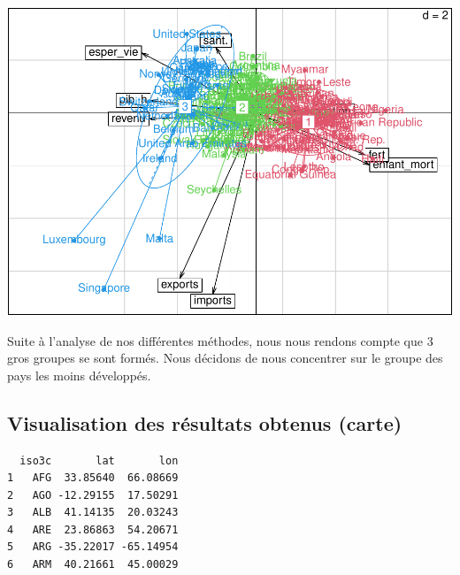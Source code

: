 \documentclass[
]{article}
\begin{document}
\includegraphics{Projet_files/figure-latex/unnamed-chunk-29-1.pdf}

Suite à l'analyse de nos différentes méthodes, nous nous rendons compte
que 3 gros groupes se sont formés. Nous décidons de nous concentrer sur
le groupe des pays les moins développés.

\hypertarget{visualisation-des-ruxe9sultats-obtenus-carte}{%
\subsection{Visualisation des résultats obtenus
(carte)}\label{visualisation-des-ruxe9sultats-obtenus-carte}}

\begin{verbatim}
  iso3c       lat       lon
1   AFG  33.85640  66.08669
2   AGO -12.29155  17.50291
3   ALB  41.14135  20.03243
4   ARE  23.86863  54.20671
5   ARG -35.22017 -65.14954
6   ARM  40.21661  45.00029
\end{verbatim}
\end{document}
